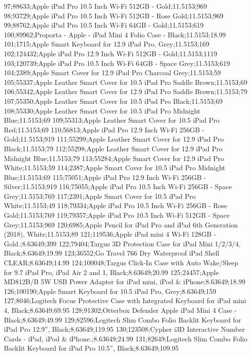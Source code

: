 97;88633;Apple iPad Pro 10.5 Inch Wi-Fi 512GB - Gold;11.5153;969
98;93729;Apple iPad Pro 10.5 Inch Wi-Fi 512GB - Rose Gold;11.5153;969
99;88762;Apple iPad Pro 10.5 Inch Wi-Fi 64GB - Gold;11.5153;619
100;89962;Proporta - Apple - iPad Mini 4 Folio Case - Black;11.5153;18.99
101;1715;Apple Smart Keyboard for 12.9 iPad Pro, Grey;11.5153;169
102;124432;Apple iPad Pro 12.9 Inch Wi-Fi 512GB - Gold;11.5153;1119
103;120739;Apple iPad Pro 10.5 Inch Wi-Fi 64GB - Space Grey;11.5153;619
104;2389;Apple Smart Cover for 12.9 iPad Pro Charcoal Grey;11.5153;59
105;55337;Apple Leather Smart Cover for 10.5 iPad Pro Saddle Brown;11.5153;69
106;55342;Apple Leather Smart Cover for 12.9 iPad Pro Saddle Brown;11.5153;79
107;55350;Apple Leather Smart Cover for 10.5 iPad Pro Black;11.5153;69
108;55330;Apple Leather Smart Cover for 10.5 iPad Pro Midnight Blue;11.5153;69
109;55313;Apple Leather Smart Cover for 10.5 iPad Pro Red;11.5153;69
110;56813;Apple iPad Pro 12.9 Inch Wi-Fi 256GB - Gold;11.5153;919
111;55299;Apple Leather Smart Cover for 12.9 iPad Pro Black;11.5153;79
112;55298;Apple Leather Smart Cover for 12.9 iPad Pro Midnight Blue;11.5153;79
113;55284;Apple Smart Cover for 12.9 iPad Pro White;11.5153;59
114;2387;Apple Smart Cover for 10.5 iPad Pro Midnight Blue;11.5153;69
115;75051;Apple iPad Pro 12.9 Inch Wi-Fi 256GB - Silver;11.5153;919
116;75055;Apple iPad Pro 10.5 Inch Wi-Fi 256GB - Space Grey;11.5153;769
117;2391;Apple Smart Cover for 10.5 iPad Pro White;11.5153;49
118;79334;Apple iPad Pro 10.5 Inch Wi-Fi 256GB - Rose Gold;11.5153;769
119;79357;Apple iPad Pro 10.5 Inch Wi-Fi 512GB - Space Grey;11.5153;969
120;6985;Apple Pencil for iPad Pro and iPad 6th Generation (2018), White;11.5153;89
121;119536;Apple iPad mini 4 Wi-Fi 128GB - Gold.;8.63649;399
122;79404;Targus 3D Protection Case for iPad Mini 1/2/3/4, Black;8.63649;19.99
123;36552;Go Travel 766 Dry Waterproof iPad Shell CLEAR;8.63649;14.99
124;100048;Targus Click-In Case with Auto Wake/Sleep for 9.7 iPad Pro, iPad Air 2 and 1, Black;8.63649;20.99
125;24457;Apple MD812B/B 5W USB Power Adapter for iPad mini, iPod & iPhone;8.63649;18.99
126;100190;Apple Smart Keyboard for 10.5 iPad Pro, Grey;8.63649;159
127;8046;Logitech Focus Protective Case with Integrated Keyboard for iPad mini 4, Black;8.63649;69.95
128;91302;Otterbox Defender Apple iPad Mini 4 Case - Black;8.63649;49.99
129;82596;Logitech Slim Combo Folio Backlit Keyboard for iPad Pro 12.9'', Black;8.63649;119.95
130;123508;Cypher i3D Interactive Number Cards - iPad, iPod & iPhone.;8.63649;24.99
131;82649;Logitech Slim Combo Folio Backlit Keyboard for iPad Pro 10.5'', Black;8.63649;109.95

